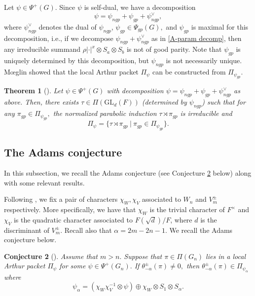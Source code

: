 \documentclass[11pt,letterpaper]{amsart}
\newcommand{\GL}{\mathrm{GL}}
\newtheorem{thm}{Theorem}[section]
\newtheorem{conj}[thm]{Conjecture}
\numberwithin{equation}{section}
\begin{document}
Let $\psi\in\Psi^+(G).$ Since $\psi$ is self-dual, we have a decomposition 
\[
\psi=\psi_{ngp} + \psi_{gp}+\psi_{ngp}^\vee,
\]
where $\psi_{ngp}^\vee$ denotes the dual of $\psi_{ngp}$, $\psi_{gp}\in\Psi_{gp}(G),$ and $\psi_{gp}$ is maximal for this decomposition, i.e., if we decompose $\psi_{ngp}+\psi_{ngp}^\vee$ as in \eqref{A-param decomp}, then any irreducible summand $\rho|\cdot|^x\otimes S_a\otimes S_b$ is not of good parity. Note that $\psi_{gp}$ is uniquely determined by this decomposition, but $\psi_{ngp}$ is not necessarily unique. M{\oe}glin showed that the local Arthur packet $\Pi_\psi$ can be constructed from $\Pi_{\psi_{gp}}.$

\begin{thm}[{\cite[Proposition 5.1]{Moe11b}}]\label{thm red to gp}
Let $\psi\in\Psi^+(G)$ with decomposition $\psi=\psi_{ngp}+\psi_{gp}+\psi_{ngp}^\vee$ as above. Then, there exists $\tau\in\Pi(\GL_d(F))$ (determined by $\psi_{ngp}$) such that for any $\pi_{gp}\in\Pi_{\psi_{gp}},$ the normalized parabolic induction $\tau\rtimes\pi_{gp}$ is irreducible and \begin{equation}\label{non-unitary A-packet}
    \Pi_\psi=\{\tau\rtimes\pi_{gp} \ | \ \pi_{gp}\in\Pi_{\psi_{gp}}\}.
\end{equation}
\end{thm}

\subsection{The Adams conjecture}\label{sec the Adams conjecture}

In this subsection, we recall the Adams conjecture (see Conjecture \ref{conj Adams} below) along with some relevant results. 

Following \cite[\S3.2]{GI14}, we fix a pair of characters $\chi_W,\chi_V$ associated to $W_n$ and $V_m^\pm$ respectively. More specifically, we have that $\chi_W$ is the trivial character of $F^\times$ and $\chi_V$ is the quadratic character associated to $F(\sqrt{d})/F$, where $d$ is the discriminant of $V_m^\pm$. Recall also that $\alpha=2m-2n-1.$ We recall the Adams conjecture below.

\begin{conj}[{\cite{Ada89}}]\label{conj Adams}
    Assume that $m>n.$
    Suppose that $\pi\in\Pi(G_n)$ lies in a local Arthur packet $\Pi_\psi$ for some $\psi\in\Psi^+(G_n).$ If $\theta_{-\alpha}^\pm(\pi)\neq 0,$ then $\theta_{-\alpha}^\pm(\pi)\in\Pi_{\psi_\alpha}$ where
    \begin{equation}\label{eqn psi_alpha}
    \psi_\alpha=
       (\chi_W\chi_V^{-1}\otimes\psi)\oplus \chi_W\otimes S_1\otimes S_\alpha.
    \end{equation}
\end{conj}
\end{document}
